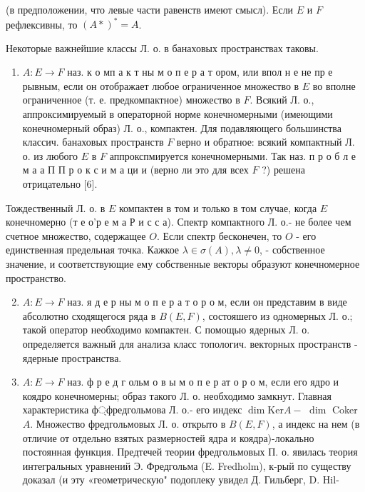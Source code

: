 \documentclass[10pt]{article}
\begin{document}
(в предположении, что левые части равенств имеют смысл). Если $E$ и $F$ рефлексивны, то $(A *)^{*}=A$.



Некоторые важнейшие классы Л. о. в банаховых пространствах таковы.



\begin{enumerate}

  \item $A: E \rightarrow F$ наз. к о мп а к т ны м о п е р а т ором, или впол н е не пр е рывным, если он отображает любое ограниченное множество в $E$ во вполне ограниченное (т. е. предкомпактное) множество в $F$. Всякий Л. о., аппроксимируемый в операторной норме конечномерными (имеющими конечномерный образ) Л. о., компактен. Для подавляющего большинства классич. банаховых пространств $F$ верно и обратное: всякий компактный Л. о. из любого $E$ в $F$ аппрокспмируется конечномерными. Так наз. п р о б л е м а а П П р о к с и м а ци и (верно ли это для всех $F$ ?) решена отрицательно [6].

\end{enumerate}



Тождественный Л. о. в $E$ компактен в том и только в том случае, когда $E$ конечномерно (т е о'р е м а Р и с с а). Спектр компактного Л. о.- не более чем счетное множество, содержащее $O$. Если спектр бесконечен, то $O$ - его единственная предельная точка. Кажкое $\lambda \in \sigma(A), \lambda \neq 0$, - собственное значение, и соответствующие ему собственные векторы образуют конечномерное пространство.



\begin{enumerate}

  \setcounter{enumi}{1}

  \item $A: E \rightarrow F$ наз. я д е р ны м о п е р а т о р о м, если он представим в виде абсолютно сходящегося ряда в $B(E, F)$, состояшего из одномерных Л. о.; такой оператор необходимо компактен. С помощью ядерных Л. о. определяется важный для анализа класс топологич. векторных пространств - ядерные пространства.



  \item $A: E \rightarrow F$ наз. ф р е д г ольм о в ы м о п е р ат о р о м, если его ядро и коядро конечномерны; образ такого Л. о. необходимо замкнут. Главная характеристика ф্фредгольмова Л. о.- его индекс $\operatorname{dim} \mathrm{Ker} A-$ $\operatorname{dim}$ Coker $A$. Множество фредгольмовых Л. о. открыто в $B(E, F)$, а индекс на нем (в отличие от отдельно взятых размерностей ядра и коядра)-локально постоянная функция. Предтечей теории фредгольмовых П. о. явилась теория интегральных уравнений Э. Фредгольма (E. Fredholm), к-рый по существу доказал (и эту «геометрическую" подоплеку увидел Д. Гильберг, D. Hil-



\end{enumerate}
\end{document}
